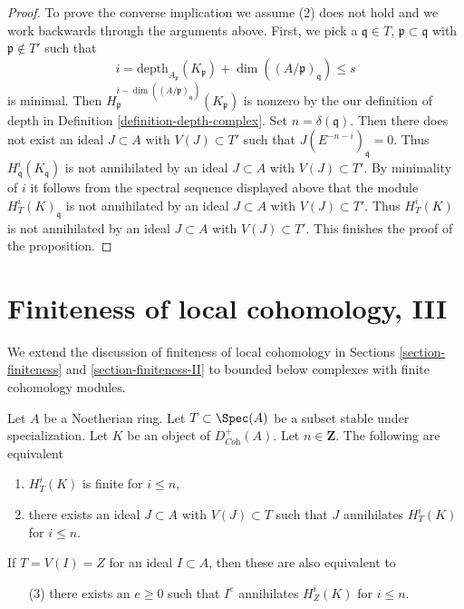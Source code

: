 \begin{proof}
\medskip\noindent
To prove the converse implication we assume (2) does not hold
and we work backwards through the arguments above. First, we pick a
$\mathfrak q \in T$, $\mathfrak p \subset \mathfrak q$
with $\mathfrak p \not \in T'$ such that
$$
i = \text{depth}_{A_\mathfrak p}(K_\mathfrak p) +
\dim((A/\mathfrak p)_\mathfrak q) \leq s
$$
is minimal. Then
$H^{i - \dim((A/\mathfrak p)_\mathfrak q)}_\mathfrak p(K_\mathfrak p)$
is nonzero by the our definition of depth in
Definition \ref{definition-depth-complex}.
Set $n = \delta(\mathfrak q)$. Then
there does not exist an ideal $J \subset A$ with $V(J) \subset T'$
such that $J(E^{-n - i})_\mathfrak q = 0$.
Thus $H^i_\mathfrak q(K_\mathfrak q)$ is not
annihilated by an ideal $J \subset A$ with $V(J) \subset T'$.
By minimality of $i$ it follows from the spectral sequence displayed above
that the module $H^i_T(K)_\mathfrak q$
is not annihilated by an ideal $J \subset A$
with $V(J) \subset T'$. Thus $H^i_T(K)$
is not annihilated by an ideal $J \subset A$
with $V(J) \subset T'$. This finishes the proof of the proposition.
\end{proof}







\section{Finiteness of local cohomology, III}
\label{section-finiteness-III}

\noindent
We extend the discussion of finiteness of local cohomology
in Sections \ref{section-finiteness} and \ref{section-finiteness-II}
to bounded below complexes with finite cohomology modules.

\begin{lemma}
\label{lemma-check-finiteness-local-cohomology-by-annihilator-complex}
Let $A$ be a Noetherian ring. Let $T \subset \Spec(A)$ be a subset stable
under specialization. Let $K$ be an object of $D_{\textit{Coh}}^+(A)$.
Let $n \in \mathbf{Z}$. The following are equivalent
\begin{enumerate}
\item $H^i_T(K)$ is finite for $i \leq n$,
\item there exists an ideal $J \subset A$ with $V(J) \subset T$
such that $J$ annihilates $H^i_T(K)$ for $i \leq n$.
\end{enumerate}
If $T = V(I) = Z$ for an ideal $I \subset A$, then these are also
equivalent to
\begin{enumerate}
\item[(3)] there exists an $e \geq 0$ such that $I^e$ annihilates
$H^i_Z(K)$ for $i \leq n$.
\end{enumerate}
\end{lemma}

